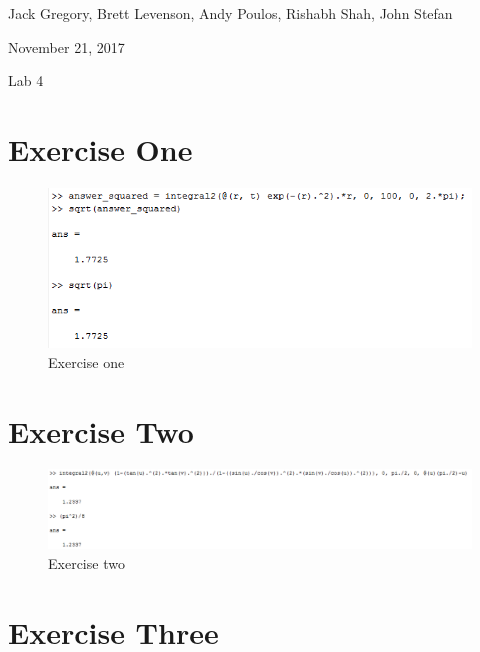 \documentclass[11pt]{article}
\begin{document}
{\Large\noindent Jack Gregory, Brett Levenson, Andy Poulos, Rishabh Shah, John Stefan

\noindent November 21, 2017

\noindent Lab 4 \\}

\section*{Exercise One}
\begin{figure}[H]
	\includegraphics[width=\textwidth]{One.PNG}
	\caption*{Exercise one}
\end{figure}

\section*{Exercise Two}
\begin{figure}[H]
	\includegraphics[width=\textwidth]{Two.PNG}
	\caption*{Exercise two}
\end{figure}

\section*{Exercise Three}
\end{document}

